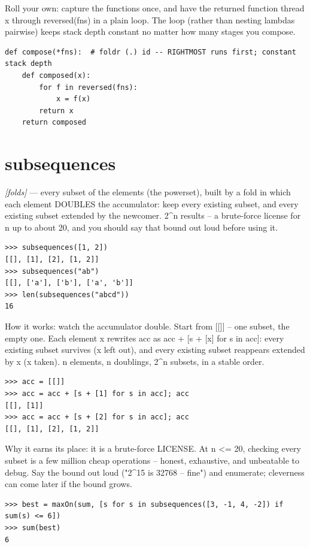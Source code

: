 \documentclass[11pt,letterpaper]{book}
\begin{document}
Roll your own: capture the functions once, and have the returned function thread x through reversed(fns) in a plain loop. The loop (rather than nesting lambdas pairwise) keeps stack depth constant no matter how many stages you compose.

\begin{lstlisting}[style=code]
def compose(*fns):  # foldr (.) id -- RIGHTMOST runs first; constant stack depth
    def composed(x):
        for f in reversed(fns):
            x = f(x)
        return x
    return composed
\end{lstlisting}

\section{subsequences}
\noindent\textit{[folds]} --- every subset of the elements (the powerset), built by a fold in which each element DOUBLES the accumulator: keep every existing subset, and every existing subset extended by the newcomer. 2\^{}n results -- a brute-force license for n up to about 20, and you should say that bound out loud before using it.
\begin{lstlisting}[style=spec]
>>> subsequences([1, 2])
[[], [1], [2], [1, 2]]
>>> subsequences("ab")
[[], ['a'], ['b'], ['a', 'b']]
>>> len(subsequences("abcd"))
16
\end{lstlisting}

How it works: watch the accumulator double. Start from [[]] -- one subset, the empty one. Each element x rewrites acc as acc + [s + [x] for s in acc]: every existing subset survives (x left out), and every existing subset reappears extended by x (x taken). n elements, n doublings, 2\^{}n subsets, in a stable order.

\begin{lstlisting}[style=spec]
>>> acc = [[]]
>>> acc = acc + [s + [1] for s in acc]; acc
[[], [1]]
>>> acc = acc + [s + [2] for s in acc]; acc
[[], [1], [2], [1, 2]]
\end{lstlisting}

Why it earns its place: it is a brute-force LICENSE. At n <= 20, checking every subset is a few million cheap operations -- honest, exhaustive, and unbeatable to debug. Say the bound out loud ("2\^{}15 is 32768 -- fine") and enumerate; cleverness can come later if the bound grows.

\begin{lstlisting}[style=spec]
>>> best = maxOn(sum, [s for s in subsequences([3, -1, 4, -2]) if sum(s) <= 6])
>>> sum(best)
6
\end{lstlisting}
\end{document}
